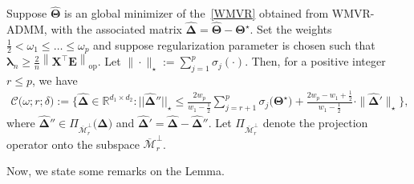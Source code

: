 \documentclass[alpha-refs]{wiley-article}
\begin{document}
\begin{lemma} \label{Cone_like_set}
Suppose $\widehat{\boldsymbol{\Theta}}$ is an global minimizer of the~\eqref{WMVR} obtained from WMVR-ADMM, with the associated matrix $\boldsymbol{\widehat{\Delta}} = \widehat{\boldsymbol{\Theta}}-\boldsymbol{\Theta^{\star}}$.
Set the weights $\frac{1}{2} < \omega_{1} \leq \dots \leq \omega_{p}$ and 
suppose regularization parameter is chosen such that $\boldsymbol{\lambda}_{n}\geq\frac{2}{n}\left\| \boldsymbol{X}^{\top}\boldsymbol{E} \right\|_{\text{op}}$.
Let $\|\cdot\|_{\star}:=\sum_{j=1}^{p}\sigma_{j}(\cdot)$.
Then, for a positive integer $r\leq p$, we have
\begin{align} \label{cone_set}
    \mathcal{C}\big( \omega;r;\delta \big) 
    := \bigg\{ \boldsymbol{\widehat{\Delta}}\in\mathbb{R}^{d_{1}\times d_{2}} :
    ||\boldsymbol{\widehat{\Delta}}''||_{\star} \leq \frac{2w_{p}}{w_{1}-\frac{1}{2}} \sum_{j=r+1}^{p}\sigma_{j}\big(\boldsymbol{\Theta^{\star}}\big) 
    + \frac{2w_{p}-w_{1}+\frac{1}{2}}{w_{1}-\frac{1}{2}}\cdot \| \boldsymbol{\widehat{\Delta}}' \|_{\star} \bigg\}, 
\end{align}
where $\boldsymbol{\widehat{\Delta}}'' \in \Pi_{\overline{\mathcal{M}}_{r}^{\perp}}\big(\boldsymbol{\widehat{\Delta}}\big)$ and $\boldsymbol{\widehat{\Delta}}'=\boldsymbol{\widehat{\Delta}}-\boldsymbol{\widehat{\Delta}}''$.
Let $\Pi_{\overline{\mathcal{M}}_{r}^{\perp}}$ denote the projection operator onto the subspace $\overline{\mathcal{M}}_{r}^{\perp}$.
\end{lemma}
Now, we state some remarks on the Lemma.
\end{document}
